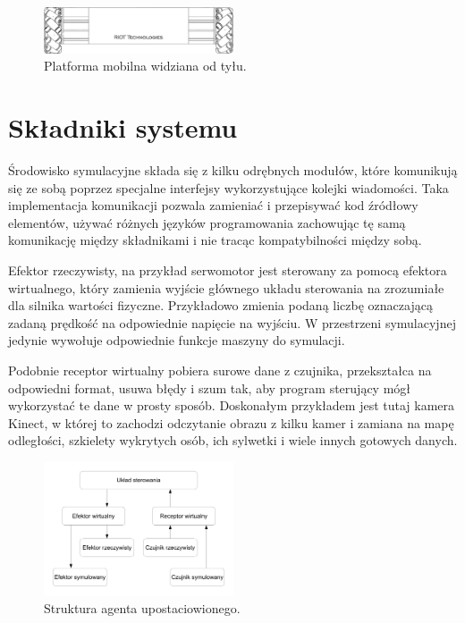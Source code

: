 \begin{figure}[H]
\centering
 \includegraphics[width=0.5\textwidth]{graphics/base_front.pdf}
\caption{Platforma mobilna widziana od tyłu.}
\end{figure} 



\section{Składniki systemu}
Środowisko symulacyjne składa się z kilku odrębnych modułów, które komunikują się ze sobą poprzez specjalne interfejsy wykorzystujące kolejki wiadomości.
Taka implementacja komunikacji pozwala zamieniać i przepisywać kod źródłowy elementów, używać różnych języków programowania zachowując tę samą komunikację między składnikami i nie tracąc kompatybilności między sobą.

Efektor rzeczywisty, na przykład serwomotor jest sterowany za pomocą efektora wirtualnego, który zamienia wyjście głównego układu sterowania na zrozumiałe dla silnika wartości fizyczne. 
Przykładowo zmienia podaną liczbę oznaczającą zadaną prędkość na odpowiednie napięcie na wyjściu. W przestrzeni symulacyjnej jedynie wywołuje odpowiednie funkcje maszyny do symulacji.

Podobnie receptor wirtualny pobiera surowe dane z czujnika, przekształca na odpowiedni format, usuwa błędy i szum tak, aby program sterujący mógł wykorzystać te dane w prosty sposób. 
Doskonałym przykładem jest tutaj kamera Kinect, w której to zachodzi odczytanie obrazu z kilku kamer i zamiana na mapę odległości, szkielety wykrytych osób, ich sylwetki i wiele innych gotowych danych.

\begin{figure}[H]
\centering
 \includegraphics[width=0.5\textwidth]{graphics/agent.pdf}
\caption{Struktura agenta upostaciowionego.}
\end{figure} 


